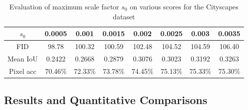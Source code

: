 \begin{table}[] \label{tab:5.3}
    \centering
    \begin{tabular}{cccccccc}
         \toprule
        $s_0$ & 0.0005 & 0.001 & 0.0015 & 0.002 & 0.0025 & 0.003 & 0.0035  \\
         \midrule
        FID & 98.78 & 100.32 & 100.59 & 102.48 & 104.52 & 104.59 & 106.40\\
        Mean IoU & 0.2422 & 0.2668 & 0.2879 & 0.3076 & 0.3023 & 0.3192 & 0.3263\\
        Pixel acc & 70.46\% & 72.33\% & 73.78\% & 74.45\% & 75.13\% & 75.33\% & 75.30\%\\
        \bottomrule
    \end{tabular}
    \caption[Evaluation of maximum scale factor on various scores]{Evaluation of maximum scale factor $s_0$ on various scores for the Cityscapes dataset}
    \label{tab:my_label}
\end{table}
\subsection{Results and Quantitative Comparisons} \label{sec:5.4.4}

